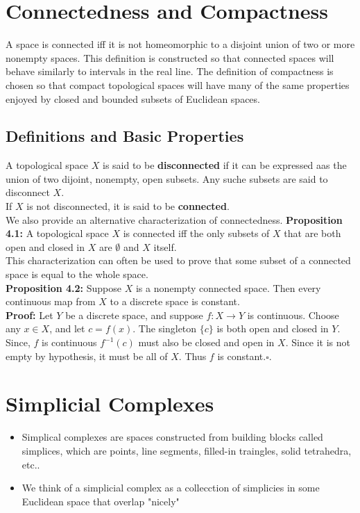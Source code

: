 \documentclass{article}
\begin{document}
  \section{Connectedness and Compactness}
A space is connected iff it is not homeomorphic to a disjoint union of two or more nonempty spaces. This definition is constructed so that connected spaces will behave similarly to intervals in the real line. The definition of compactness is chosen so that compact topological spaces will have many of the same properties enjoyed by closed and bounded subsets of Euclidean spaces.
\subsection{Definitions and Basic Properties}
A topological space \(X\) is said to be \textbf{disconnected} if it can be expressed aas the union of two dijoint, nonempty, open subsets. Any suche subsets are said to disconnect \(X\).\\
If \(X\) is not disconnected, it is said to be \textbf{connected}.\\
We also provide an alternative characterization of connectedness.
\textbf{Proposition 4.1:} A topological space \(X\) is connected iff the only subsets of \(X\) that are both open and closed in \(X\) are \(\emptyset\) and \(X\) itself.\\

This characterization can often be used to prove that some subset of a connected space is equal to the whole space.\\

\textbf{Proposition 4.2:} Suppose \(X\) is a nonempty connected space. Then every continuous map from \(X\) to a discrete space is constant.\\

\textbf{Proof:} Let \(Y\) be a discrete space, and suppose \(f:X\to Y\) is continuous. Choose any \(x\in X\), and let \(c=f(x)\). The singleton \(\{c\}\) is both open and closed in \(Y\). Since, \(f\) is continuous \(f^{-1}(c)\) must also be closed and open in \(X\). Since it is not empty by hypothesis, it must be all of \(X\). Thus \(f\) is constant.\(\square\).\\

  \section{Simplicial Complexes}

  \begin{itemize}
      \item Simplical complexes are spaces constructed from building blocks called simplices, which are points, line segments, filled-in traingles, solid tetrahedra, etc..
      \item We think of a simplicial complex as a collecction of simplicies in some Euclidean space that overlap "nicely"
  \end{itemize}
\end{document}

